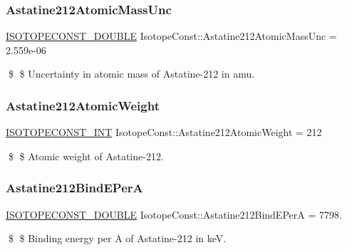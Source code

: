 \subsubsection{\texorpdfstring{Astatine212\+Atomic\+Mass\+Unc}{Astatine212AtomicMassUnc}}
{\footnotesize\ttfamily \mbox{\hyperlink{group___isotope_const-_macros_ga8f45a7272ce02c0b4c65c44636ed719a}{I\+S\+O\+T\+O\+P\+E\+C\+O\+N\+S\+T\+\_\+\+D\+O\+U\+B\+LE}} Isotope\+Const\+::\+Astatine212\+Atomic\+Mass\+Unc = 2.\+559e-\/06}

\$ \$ Uncertainty in atomic mass of Astatine-\/212 in amu. \mbox{\label{group___isotope_const-_astatine-_at212_ga0ab544751d74b134bbf294eaa13c63f8}} 
\subsubsection{\texorpdfstring{Astatine212\+Atomic\+Weight}{Astatine212AtomicWeight}}
{\footnotesize\ttfamily \mbox{\hyperlink{group___isotope_const-_macros_ga5f18360b3e99483a35c32d789e62621c}{I\+S\+O\+T\+O\+P\+E\+C\+O\+N\+S\+T\+\_\+\+I\+NT}} Isotope\+Const\+::\+Astatine212\+Atomic\+Weight = 212}

\$ \$ Atomic weight of Astatine-\/212. \mbox{\label{group___isotope_const-_astatine-_at212_ga830c16b06c0991e457f31eb22489c7f0}} 
\subsubsection{\texorpdfstring{Astatine212\+Bind\+E\+PerA}{Astatine212BindEPerA}}
{\footnotesize\ttfamily \mbox{\hyperlink{group___isotope_const-_macros_ga8f45a7272ce02c0b4c65c44636ed719a}{I\+S\+O\+T\+O\+P\+E\+C\+O\+N\+S\+T\+\_\+\+D\+O\+U\+B\+LE}} Isotope\+Const\+::\+Astatine212\+Bind\+E\+PerA = 7798.}

\$ \$ Binding energy per A of Astatine-\/212 in keV. \mbox{\label{group___isotope_const-_astatine-_at212_ga9cf2437ccda5691a078ad4fea30340e4}} 
